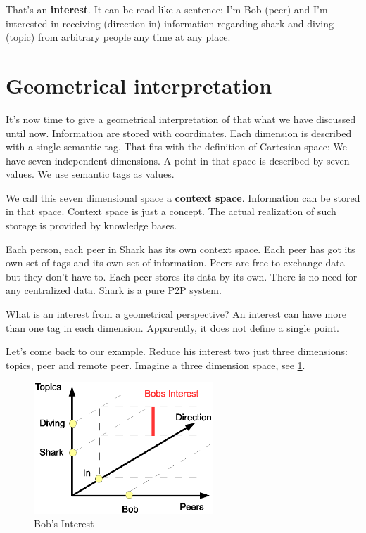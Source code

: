 That's an {\bf interest}. It can be read like a sentence: I'm Bob (peer) and I'm interested in receiving (direction in) information regarding shark and diving (topic) from arbitrary people any time at any place.

\section{Geometrical interpretation}
It's now time to give a geometrical interpretation of that what we have discussed until now. Information are stored with coordinates. Each dimension is described with a single semantic tag. That fits with the definition of Cartesian space: We have seven independent dimensions. A point in that space is described by seven values. We use semantic tags as values.

We call this seven dimensional space a {\bf context space}. Information can be stored in that space. Context space is just a concept. The actual realization of such storage is provided by knowledge bases.

Each person, each peer in Shark has its own context space. Each peer has got its own set of tags and its own set of information. Peers are free to exchange data but they don't have to. Each peer stores its data by its own. There is no need for any centralized data. Shark is a pure P2P system.

What is an interest from a geometrical perspective? An interest can have more than one tag in each dimension. Apparently, it does not define a single point. 

Let's come back to our example. Reduce his interest two just three dimensions: topics, peer and remote peer. Imagine a three dimension space, 
see \ref{fig:contextspace}. 

\begin{figure}[t]
\centering
\includegraphics[width=0.60\textwidth]{bobsInterest.eps}
\caption{Bob's Interest}
\label{fig:contextspace}
\end{figure}


